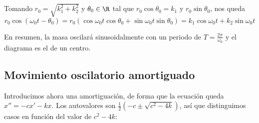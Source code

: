 \documentclass[../main.tex]{subfiles}
\begin{document}
Tomando \(r_0 = \sqrt{k_1^2+k_2^2}\) y \(\theta_0 \in \R\) tal que \(r_0 \cos
\theta_0 = k_1\) y \(r_0 \sin \theta_0\), nos queda
\[r_0 \cos (\omega_0 t - \theta_0) = r_0(\cos \omega_0 t \cos \theta_0 + \sin
  \omega_0 t \sin \theta_0) = k_1 \cos \omega_0 t + k_2 \sin \omega_0 t\]

En resumen, la masa oscilará sinusoidalmente con un periodo de \(T =
\frac{2\pi}{\omega_0}\) y el diagrama es el de un centro.

\subsection{Movimiento oscilatorio amortiguado}
Introducimos ahora una amortiguación, de forma que la ecuación queda
\(x'' = - cx' - kx\). Los autovalores son \(\frac{1}{2}(-c \pm \sqrt{c^2-4k})\), así
  que distinguimos casos en función del valor de \(c^2-4k\):
\end{document}
